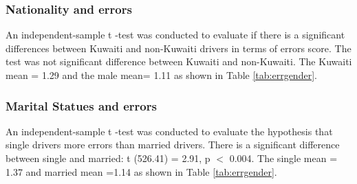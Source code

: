 \documentclass[preprint,12pt,a4paper,authoryear]{elsarticle}
\begin{document}
\begin{linenumbers}
\subsubsection{Nationality and errors }
An independent-sample t -test was conducted to evaluate if there is a significant differences between Kuwaiti and non-Kuwaiti drivers in terms of errors score. The test was not significant difference between Kuwaiti and non-Kuwaiti. The Kuwaiti mean = 1.29 and the male mean= 1.11 as shown in Table \ref{tab:errgender}.

\subsubsection{Marital Statues and errors}
An independent-sample t -test was conducted to evaluate the hypothesis that single drivers more errors than married drivers. There is a significant difference between single and married: t (526.41) = 2.91, p $<$ 0.004. The single mean = 1.37 and married mean =1.14 as shown in Table \ref{tab:errgender}.

\begin{table}[H]
\centering
\caption{My caption}
\label{tab:errgender}
\end{table}


\end{linenumbers}
\end{document}
